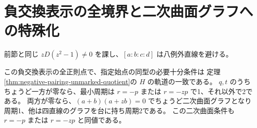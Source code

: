 \section{負交換表示の全境界と二次曲面グラフへの特殊化}
\label{sec:negative-pairing-boundary}
前節と同じ $zD(z^2-1)\ne0$ を課し、$[a:b:c:d]$ は八例外直線を避ける。
\begin{theorem}\label{thm:negative-pairing-boundary}
この負交換表示の全正則点で、指定始点の同型の必要十分条件は
定理\ref{thm:negative-pairing-unmarked-quotient}の $H$ の軌道の一致である。
$q,t$ のうちちょうど一方が零なら、最小周期は $r=-p$ または $r=-zp$ で1、それ以外で2である。
両方が零なら、$(a+b)(a+zb)=0$ でちょうど二次曲面グラフとなり周期1、他は四直線のグラフを台に持ち周期2である。
この二次曲面条件も $r=-p$ または $r=-zp$ と同値である。
\end{theorem}
